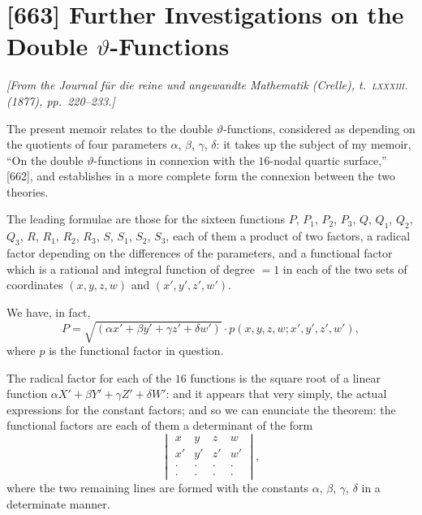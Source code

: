 \documentclass[11pt,a4paper]{article}
\theoremstyle{plain}
\theoremstyle{definition}
\newcommand{\te}{\vartheta} %
\begin{document}
\newpage
\section{[663] Further Investigations on the Double $\vartheta$-Functions}
\label{sec:663}

\noindent\textit{[From the \emph{Journal f\"ur die reine und angewandte Mathematik} (Crelle), t.~\textsc{lxxxiii}. (1877), pp.~220--233.]}

\medskip

The present memoir relates to the double $\te$-functions, considered as depending on the quotients of four parameters $\alpha$, $\beta$, $\gamma$, $\delta$: it takes up the subject of my memoir, ``On the double $\te$-functions in connexion with the $16$-nodal quartic surface,'' [662], and establishes in a more complete form the connexion between the two theories.

The leading formulae are those for the sixteen functions $P$, $P_1$, $P_2$, $P_3$, $Q$, $Q_1$, $Q_2$, $Q_3$, $R$, $R_1$, $R_2$, $R_3$, $S$, $S_1$, $S_2$, $S_3$, each of them a product of two factors, a radical factor depending on the differences of the parameters, and a functional factor which is a rational and integral function of degree $= 1$ in each of the two sets of coordinates $(x, y, z, w)$ and $(x', y', z', w')$.

We have, in fact,
\[
P = \sqrt{(\alpha x' + \beta y' + \gamma z' + \delta w')} \cdot p(x, y, z, w; x', y', z', w'),
\]
where $p$ is the functional factor in question.

The radical factor for each of the $16$ functions is the square root of a linear function $\alpha X' + \beta Y' + \gamma Z' + \delta W'$: and it appears that very simply, the actual expressions for the constant factors; and so we can enunciate the theorem: the functional factors are each of them a determinant of the form
\[
\begin{vmatrix}
x & y & z & w \\
x' & y' & z' & w' \\
\cdot & \cdot & \cdot & \cdot \\
\cdot & \cdot & \cdot & \cdot
\end{vmatrix},
\]
where the two remaining lines are formed with the constants $\alpha$, $\beta$, $\gamma$, $\delta$ in a determinate manner.

\smallskip
\end{document}
